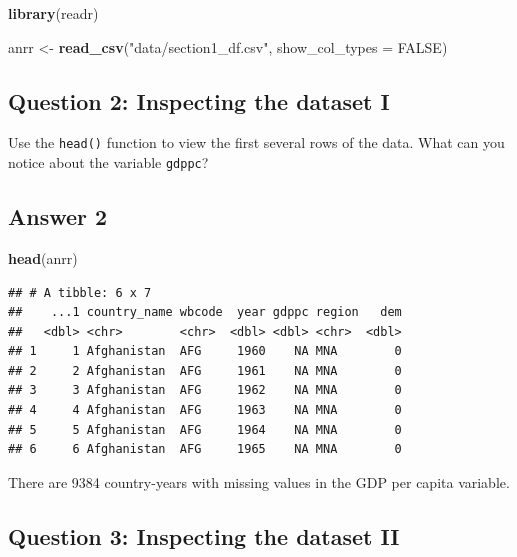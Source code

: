 \documentclass[
  11pt,
  letterpaper]{article}
\newenvironment{Shaded}{\begin{snugshade}}{\end{snugshade}}
\newcommand{\AttributeTok}[1]{\textcolor[rgb]{0.13,0.29,0.53}{#1}}
\newcommand{\ConstantTok}[1]{\textcolor[rgb]{0.56,0.35,0.01}{#1}}
\newcommand{\FunctionTok}[1]{\textcolor[rgb]{0.13,0.29,0.53}{\textbf{#1}}}
\newcommand{\NormalTok}[1]{#1}
\newcommand{\OtherTok}[1]{\textcolor[rgb]{0.56,0.35,0.01}{#1}}
\newcommand{\StringTok}[1]{\textcolor[rgb]{0.31,0.60,0.02}{#1}}
\begin{document}
\begin{Shaded}
\begin{Highlighting}[]
\FunctionTok{library}\NormalTok{(readr)}

\NormalTok{anrr }\OtherTok{\textless{}{-}} \FunctionTok{read\_csv}\NormalTok{(}\StringTok{"data/section1\_df.csv"}\NormalTok{, }
                \AttributeTok{show\_col\_types =} \ConstantTok{FALSE}\NormalTok{)}
\end{Highlighting}
\end{Shaded}

\subsection{Question 2: Inspecting the dataset
I}\label{question-2-inspecting-the-dataset-i}

Use the \texttt{head()} function to view the first several rows of the
data. What can you notice about the variable \texttt{gdppc}?

\subsection{Answer 2}\label{answer-2}

\begin{Shaded}
\begin{Highlighting}[]
\FunctionTok{head}\NormalTok{(anrr)}
\end{Highlighting}
\end{Shaded}

\begin{verbatim}
## # A tibble: 6 x 7
##    ...1 country_name wbcode  year gdppc region   dem
##   <dbl> <chr>        <chr>  <dbl> <dbl> <chr>  <dbl>
## 1     1 Afghanistan  AFG     1960    NA MNA        0
## 2     2 Afghanistan  AFG     1961    NA MNA        0
## 3     3 Afghanistan  AFG     1962    NA MNA        0
## 4     4 Afghanistan  AFG     1963    NA MNA        0
## 5     5 Afghanistan  AFG     1964    NA MNA        0
## 6     6 Afghanistan  AFG     1965    NA MNA        0
\end{verbatim}

There are 9384 country-years with missing values in the GDP per capita
variable.

\subsection{Question 3: Inspecting the dataset
II}\label{question-3-inspecting-the-dataset-ii}
\end{document}
